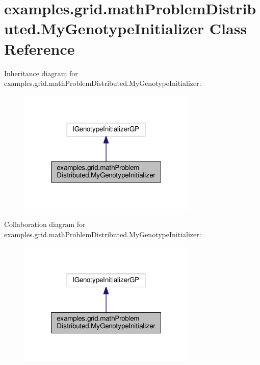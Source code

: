 \hypertarget{classexamples_1_1grid_1_1math_problem_distributed_1_1_my_genotype_initializer}{\section{examples.\-grid.\-math\-Problem\-Distributed.\-My\-Genotype\-Initializer Class Reference}
\label{classexamples_1_1grid_1_1math_problem_distributed_1_1_my_genotype_initializer}
}


Inheritance diagram for examples.\-grid.\-math\-Problem\-Distributed.\-My\-Genotype\-Initializer\-:
\nopagebreak
\begin{figure}[H]
\begin{center}
\leavevmode
\includegraphics[width=240pt]{classexamples_1_1grid_1_1math_problem_distributed_1_1_my_genotype_initializer__inherit__graph}
\end{center}
\end{figure}


Collaboration diagram for examples.\-grid.\-math\-Problem\-Distributed.\-My\-Genotype\-Initializer\-:
\nopagebreak
\begin{figure}[H]
\begin{center}
\leavevmode
\includegraphics[width=240pt]{classexamples_1_1grid_1_1math_problem_distributed_1_1_my_genotype_initializer__coll__graph}
\end{center}
\end{figure}
